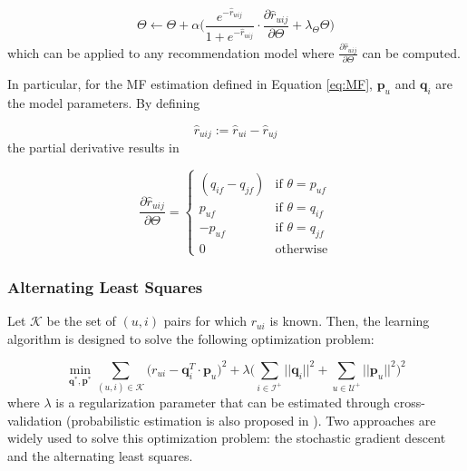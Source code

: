    \begin{equation}
       \Theta \leftarrow \Theta + \alpha \Bigg( \frac{e^{-\hat{r}_{uij}}}{1+e^{-\hat{r}_{uij}}} \cdot \frac{\partial \hat{r}_{uij}}{\partial \Theta} + \lambda_\Theta \Theta \Bigg)
       \label{eq:bpr_update}
   \end{equation} which can be applied to any recommendation model where $\frac{\partial \hat{r}_{uij}}{\partial \Theta}$ can be computed. 
   
   In particular, for the MF estimation defined in Equation \ref{eq:MF}, $\mathbf{p}_u$ and $\mathbf{q}_i$ are the model parameters. By defining 
   
   \begin{equation*}
       \hat{r}_{uij} := \hat{r}_{ui} - \hat{r}_{uj}
   \end{equation*}the partial derivative results in
   
   \begin{equation}
       \frac{\partial \hat{r}_{uij}}{\partial \Theta} = 
           \begin{cases}
                (q_{if} - q_{jf}) & \text{if $\theta = p_{uf}$}\\
                p_{uf} & \text{if $\theta = q_{if}$}\\
                -p_{uf} & \text{if $\theta = q_{jf}$}\\
                0 & \text{otherwise}
            \end{cases}
   \end{equation}
   
   \subsubsection{Alternating Least Squares}
    
    Let $\mathcal{K}$ be the set of $(u,i)$ pairs for which $r_{ui}$ is known. Then, the learning algorithm is designed to solve the following optimization problem: 
    
    \begin{equation}
        \label{eq:mf_min}
        \min_{\mathbf{q}^*, \mathbf{p}^*} \sum_{(u,i) \in \mathcal{K}} \bigg(r_{ui} - \mathbf{q}^T_i \cdot \mathbf{p}_u\bigg)^2 + \lambda \bigg(\sum_{i \in \mathcal{I}^+}||\mathbf{q}_i||^2 + \sum_{u \in \mathcal{U}^+}||\mathbf{p}_u||^2 \bigg)^2
    \end{equation} where $\lambda$ is a regularization parameter that can be estimated through cross-validation (probabilistic estimation is also proposed in \cite{2007ProbMF}). Two approaches are widely used to solve this optimization problem: the stochastic gradient descent and the alternating least squares. 
    
